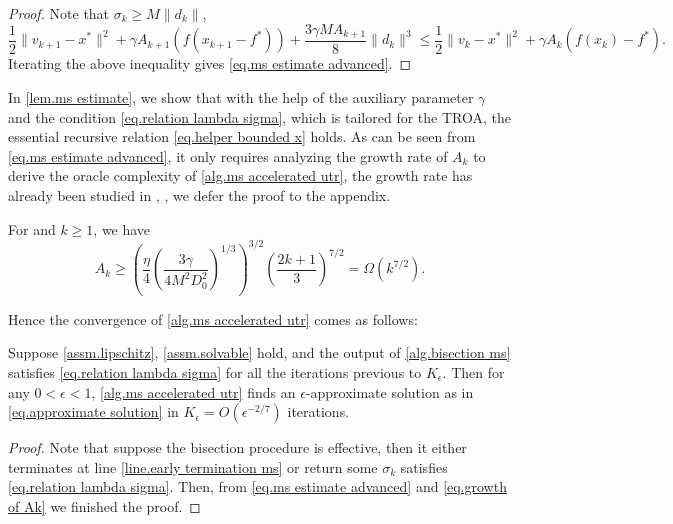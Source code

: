 \documentclass{article}
\begin{document}
\begin{proof}
    Note that $\sigma_k \geq M\|d_k\|$,
    \begin{equation*}
        \frac{1}{2}\|v_{k+1}-x^* \|^2 +\gamma A_{k+1}\left (f(x_{k+1}-f^*)\right)+ \frac{3\gamma M A_{k+1}}{8}\|d_k\|^3 \leq \frac{1}{2}\|v_k-x^*\|^2 +\gamma A_k \left (f(x_k)-f^*\right).
    \end{equation*}
    Iterating the above inequality gives \eqref{eq.ms estimate advanced}.
\end{proof}
In \autoref{lem.ms estimate}, we show that with the help of the auxiliary parameter $\gamma$ and the condition \eqref{eq.relation lambda sigma}, which is tailored for the TROA, the essential recursive relation \eqref{eq.helper bounded x} holds. As can be seen from \eqref{eq.ms estimate advanced}, it only requires analyzing the growth rate of $A_k$ to derive the oracle complexity of \autoref{alg.ms accelerated utr}, the growth rate has already been studied in \citet[Lemma 4.2]{monteiro2013accelerated}, \citet[Lemma 4.3.5]{nesterov_lectures_2018}, we defer the proof to the appendix.
\begin{lemma}
    \label{lem.growth of Ak}
    For and $k\geq 1$, we have
    \begin{equation}
        \label{eq.growth of Ak}
        A_k \geq \left(\frac{\eta}{4}\left (\frac{3\gamma}{4M^2D_0^2}\right)^{1/3}\right)^{3 / 2}\left(\frac{2 k+1}{3}\right)^{7/2} = \Omega(k^{7/2}).
    \end{equation}
\end{lemma}
Hence the convergence of \autoref{alg.ms accelerated utr} comes as follows:
\begin{theorem}\label{thm.outer loop complexity}
    Suppose \autoref{assm.lipschitz},  \autoref{assm.solvable} hold, and the output of \autoref{alg.bisection ms} satisfies \eqref{eq.relation lambda sigma} for all the iterations previous to $K_\epsilon$. Then for any $0<\epsilon<1$, \autoref{alg.ms accelerated utr} finds an $\epsilon$-approximate solution as in \eqref{eq.approximate solution} in $K_\epsilon= O(\epsilon^{-2/7})$ iterations.
\end{theorem}
\begin{proof}
    Note that suppose the bisection procedure is effective, then it either terminates at line \ref{line.early termination ms} or return some $\sigma_k$ satisfies \eqref{eq.relation lambda sigma}. Then, from \eqref{eq.ms estimate advanced} and \eqref{eq.growth of Ak} we finished the proof.
\end{proof}
\end{document}
